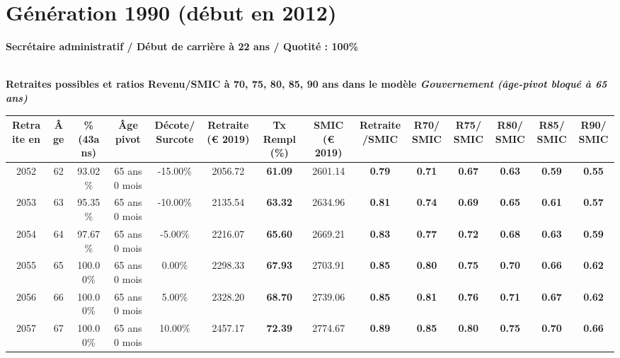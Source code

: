 \newpage 
 
\section{Génération 1990 (début en 2012)\label{SecretaireAdmin_100_1990_22_0}} 
 
{\bf \noindent Secrétaire administratif / Début de carrière à 22 ans / Quotité : 100\%}  ~ 

 ~\\{\bf \noindent Retraites possibles et ratios Revenu/SMIC à 70, 75, 80, 85, 90 ans dans le modèle \emph{Gouvernement (âge-pivot bloqué à 65 ans)}}  
 
\begin{adjustbox}{max width=\textwidth} 
\begin{tabular}[htb]{|c|c||c|c|c||c|c||c|c||c|c|c|c|c|} 
\hline 
 Retraite en &  Âge &  \%(43ans) &  Âge pivot &  Décote/Surcote &  Retraite (\euro{} 2019) &  Tx Rempl(\%) &  SMIC (\euro{} 2019) &  Retraite/SMIC &  R70/SMIC &  R75/SMIC &  R80/SMIC &  R85/SMIC &  R90/SMIC \\ 
\hline \hline 
 2052 &  62 &  93.02\% &  65 ans 0 mois &  -15.00\% &  2056.72 &  {\bf 61.09} &  2601.14 &  {\bf {\color{red} 0.79}} &  {\bf {\color{red} 0.71}} &  {\bf {\color{red} 0.67}} &  {\bf {\color{red} 0.63}} &  {\bf {\color{red} 0.59}} &  {\bf {\color{red} 0.55}} \\ 
\hline 
 2053 &  63 &  95.35\% &  65 ans 0 mois &  -10.00\% &  2135.54 &  {\bf 63.32} &  2634.96 &  {\bf {\color{red} 0.81}} &  {\bf {\color{red} 0.74}} &  {\bf {\color{red} 0.69}} &  {\bf {\color{red} 0.65}} &  {\bf {\color{red} 0.61}} &  {\bf {\color{red} 0.57}} \\ 
\hline 
 2054 &  64 &  97.67\% &  65 ans 0 mois &  -5.00\% &  2216.07 &  {\bf 65.60} &  2669.21 &  {\bf {\color{red} 0.83}} &  {\bf {\color{red} 0.77}} &  {\bf {\color{red} 0.72}} &  {\bf {\color{red} 0.68}} &  {\bf {\color{red} 0.63}} &  {\bf {\color{red} 0.59}} \\ 
\hline 
 2055 &  65 &  100.00\% &  65 ans 0 mois &  0.00\% &  2298.33 &  {\bf 67.93} &  2703.91 &  {\bf {\color{red} 0.85}} &  {\bf {\color{red} 0.80}} &  {\bf {\color{red} 0.75}} &  {\bf {\color{red} 0.70}} &  {\bf {\color{red} 0.66}} &  {\bf {\color{red} 0.62}} \\ 
\hline 
 2056 &  66 &  100.00\% &  65 ans 0 mois &  5.00\% &  2328.20 &  {\bf 68.70} &  2739.06 &  {\bf {\color{red} 0.85}} &  {\bf {\color{red} 0.81}} &  {\bf {\color{red} 0.76}} &  {\bf {\color{red} 0.71}} &  {\bf {\color{red} 0.67}} &  {\bf {\color{red} 0.62}} \\ 
\hline 
 2057 &  67 &  100.00\% &  65 ans 0 mois &  10.00\% &  2457.17 &  {\bf 72.39} &  2774.67 &  {\bf {\color{red} 0.89}} &  {\bf {\color{red} 0.85}} &  {\bf {\color{red} 0.80}} &  {\bf {\color{red} 0.75}} &  {\bf {\color{red} 0.70}} &  {\bf {\color{red} 0.66}} \\ 
\hline 
\hline 
\end{tabular} 
\end{adjustbox} 
 
